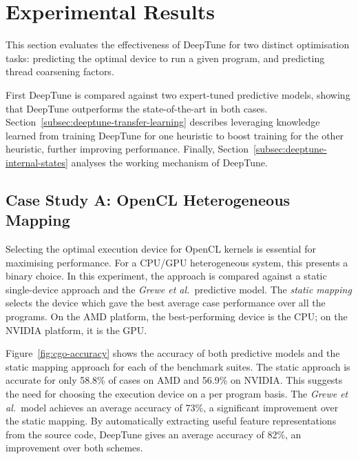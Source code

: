 \section{Experimental Results}
\label{sec:deeptune-results}

This section evaluates the effectiveness of DeepTune for two distinct optimisation tasks: predicting the optimal device to run a given program, and predicting thread coarsening factors.

First DeepTune is compared against two expert-tuned predictive models, showing that DeepTune outperforms the state-of-the-art in both cases. Section~\ref{subsec:deeptune-transfer-learning} describes leveraging knowledge learned from training DeepTune for one heuristic to boost training for the other heuristic, further improving performance. Finally, Section~\ref{subsec:deeptune-internal-states} analyses the working mechanism of DeepTune.


\subsection{Case Study A: OpenCL Heterogeneous Mapping}

Selecting the optimal execution device for OpenCL kernels is essential for maximising performance. For a CPU/GPU heterogeneous system, this presents a binary choice. In this experiment, the approach is compared against a static single-device approach and the \emph{Grewe et al.\ }predictive model. The \emph{static mapping} selects the device which gave the best average case performance over all the programs. On the AMD platform, the best-performing device is the CPU; on the NVIDIA platform, it is the GPU.

Figure~\ref{fig:cgo-accuracy} shows the accuracy of both predictive models and the static mapping approach for each of the benchmark suites. The static approach is accurate for only 58.8\% of cases on AMD and 56.9\% on NVIDIA. This suggests the need for choosing the execution device on a per program basis. The \emph{Grewe et al.\ }model achieves an average accuracy of 73\%, a significant improvement over the static mapping. By automatically extracting useful feature representations from the source code, DeepTune gives an average accuracy of 82\%, an improvement over both schemes.

